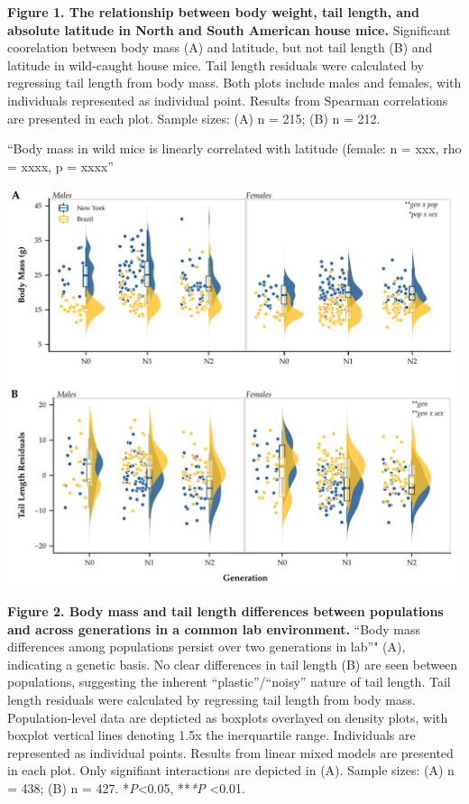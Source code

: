 \documentclass[]{article}
\begin{document}
\textbf{Figure 1. The relationship between body weight, tail length, and
absolute latitude in North and South American house mice.} Significant
coorelation between body mass (A) and latitude, but not tail length (B)
and latitude in wild-caught house mice. Tail length residuals were
calculated by regressing tail length from body mass. Both plots include
males and females, with individuals represented as individual point.
Results from Spearman correlations are presented in each plot. Sample
sizes: (A) n = 215; (B) n = 212.

``Body mass in wild mice is linearly correlated with latitude (female: n
= xxx, rho = xxxx, p = xxxx''

\newpage

\includegraphics{../figures/generation_phenotypes.pdf}

\textbf{Figure 2. Body mass and tail length differences between
populations and across generations in a common lab environment.} ``Body
mass differences among populations persist over two generations in
lab''" (A), indicating a genetic basis. No clear differences in tail
length (B) are seen between populations, suggesting the inherent
``plastic''/``noisy'' nature of tail length. Tail length residuals were
calculated by regressing tail length from body mass. Population-level
data are depticted as boxplots overlayed on density plots, with boxplot
vertical lines denoting 1.5x the inerquartile range. Individuals are
represented as individual points. Results from linear mixed models are
presented in each plot. Only signifiant interactions are depicted in
(A). Sample sizes: (A) n = 438; (B) n = 427. *\emph{P}\textless{}0.05,
**\emph{*P} \textless{}0.01.
\end{document}

